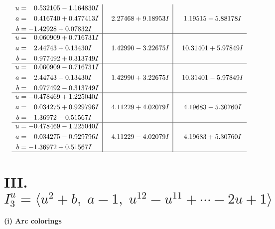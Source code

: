 \documentclass[1p]{elsarticle_modified}
\theoremstyle{definition}
\begin{document}
$$\begin{array}{c|c|c}
\begin{aligned}
u &= \phantom{-}0.532105 - 1.164830 I \\
a &= \phantom{-}0.416740 + 0.477413 I \\
b &= -1.42928 + 0.07832 I\end{aligned}
 & \phantom{-}2.27468 + 9.18953 I & \phantom{-}1.19515 - 5.88178 I \\ \hline\begin{aligned}
u &= \phantom{-}0.060909 + 0.716731 I \\
a &= \phantom{-}2.44743 + 0.13430 I \\
b &= \phantom{-}0.977492 + 0.313749 I\end{aligned}
 & \phantom{-}1.42990 - 3.22675 I & \phantom{-}10.31401 + 5.97849 I \\ \hline\begin{aligned}
u &= \phantom{-}0.060909 - 0.716731 I \\
a &= \phantom{-}2.44743 - 0.13430 I \\
b &= \phantom{-}0.977492 - 0.313749 I\end{aligned}
 & \phantom{-}1.42990 + 3.22675 I & \phantom{-}10.31401 - 5.97849 I \\ \hline\begin{aligned}
u &= -0.478469 + 1.225040 I \\
a &= \phantom{-}0.034275 + 0.929796 I \\
b &= -1.36972 - 0.51567 I\end{aligned}
 & \phantom{-}4.11229 + 4.02079 I & \phantom{-}4.19683 - 5.30760 I \\ \hline\begin{aligned}
u &= -0.478469 - 1.225040 I \\
a &= \phantom{-}0.034275 - 0.929796 I \\
b &= -1.36972 + 0.51567 I\end{aligned}
 & \phantom{-}4.11229 - 4.02079 I & \phantom{-}4.19683 + 5.30760 I\\
 \hline 
 \end{array}$$\newpage\newpage\renewcommand{\arraystretch}{1}
\centering \section*{III. $I^u_{3}= \langle u^2+b,\;a-1,\;u^{12}- u^{11}+\cdots-2 u+1 \rangle$}
\flushleft \textbf{(i) Arc colorings}\\
\end{document}
